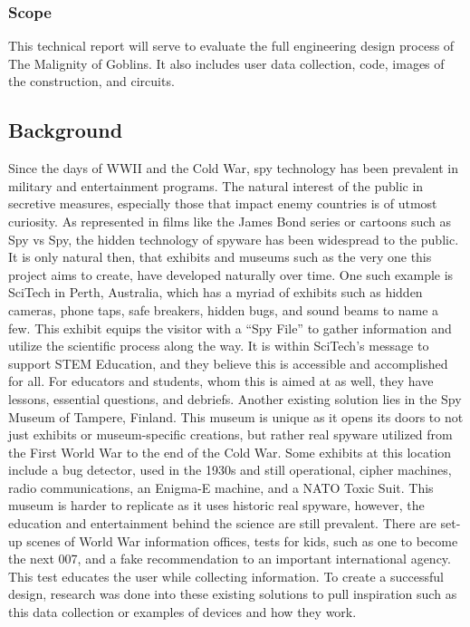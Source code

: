\documentclass[conference]{IEEEtran}
\begin{document}
\subsubsection{Scope}

\par This technical report will serve to evaluate the full engineering design process of The Malignity of Goblins. It also includes user data collection, code, images of the construction, and circuits. 

\subsection{Background}

\par Since the days of WWII and the Cold War, spy technology has been prevalent in military and entertainment programs. The natural interest of the public in secretive measures, especially those that impact enemy countries is of utmost curiosity. As represented in films like the James Bond series or cartoons such as Spy vs Spy, the hidden technology of spyware has been widespread to the public. It is only natural then, that exhibits and museums such as the very one this project aims to create, have developed naturally over time. One such example is SciTech in Perth, Australia, which has a myriad of exhibits such as hidden cameras, phone taps, safe breakers, hidden bugs, and sound beams to name a few. This exhibit equips the visitor with a “Spy File” to gather information and utilize the scientific process along the way. It is within SciTech’s message to support STEM Education, and they believe this is accessible and accomplished for all. For educators and students, whom this is aimed at as well, they have lessons, essential questions, and debriefs. Another existing solution lies in the Spy Museum of Tampere, Finland. This museum is unique as it opens its doors to not just exhibits or museum-specific creations, but rather real spyware utilized from the First World War to the end of the Cold War. Some exhibits at this location include a bug detector, used in the 1930s and still operational, cipher machines, radio communications, an Enigma-E machine, and a NATO Toxic Suit. This museum is harder to replicate as it uses historic real spyware, however, the education and entertainment behind the science are still prevalent. There are set-up scenes of World War information offices, tests for kids, such as one to become the next 007, and a fake recommendation to an important international agency. This test educates the user while collecting information. To create a successful design, research was done into these existing solutions to pull inspiration such as this data collection or examples of devices and how they work. 
\end{document}

